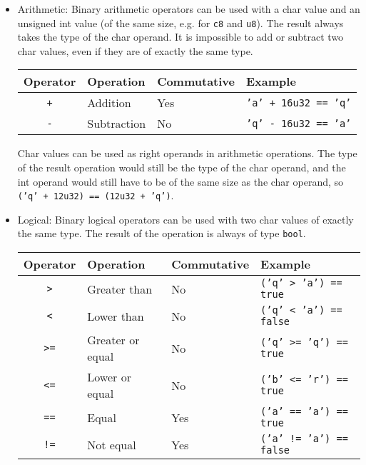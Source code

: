 \begin{itemize}
\item Arithmetic: Binary arithmetic operators can be used with a char value and
  an unsigned int value (of the same size, e.g. for \texttt{c8} and
  \texttt{u8}). The result always takes the type of the char operand. It is
  impossible to add or subtract two char values, even if they are of exactly the
  same type.

  \begin{center}
    \vspace{-5pt}\begin{adjustbox}{max width=1.0\linewidth}
      \begin{tabular}{|c|lll|}
        \hline
        Operator & Operation & Commutative & Example\\[0pt]
        \hline
        \hline
        \texttt{+} & Addition & Yes & \texttt{'a' + 16u32 == 'q'}\\[0pt]
        \texttt{-} & Subtraction & No & \texttt{'q' - 16u32 == 'a'}\\[0pt]
        \hline
      \end{tabular}
  \end{adjustbox}\end{center}


  Char values can be used as right operands in arithmetic operations. The type of
  the result operation would still be the type of the char operand, and the int
  operand would still have to be of the same size as the char operand, so
  \texttt{('q' + 12u32) == (12u32 + 'q')}.

\item Logical: Binary logical operators can be used with two char values of
  exactly the same type. The result of the operation is always of type
  \texttt{bool}.

  \begin{center}
    \vspace{-10pt}\begin{adjustbox}{max width=1.0\linewidth}
      \begin{tabular}{|c|lll|}
        \hline
        Operator & Operation & Commutative & Example\\[0pt]
        \hline
        \hline
        \texttt{>} & Greater than & No & \texttt{('q' > 'a') == true}\\[0pt]
        \texttt{<} & Lower than & No & \texttt{('q' < 'a') == false}\\[0pt]
        \texttt{>=} & Greater or equal & No & \texttt{('q' >= 'q') == true}\\[0pt]
        \texttt{<=} & Lower or equal & No & \texttt{('b' <= 'r') == true}\\[0pt]
        \texttt{==} & Equal & Yes & \texttt{('a' == 'a') == true}\\[0pt]
        \texttt{!=} & Not equal & Yes & \texttt{('a' != 'a') == false}\\[0pt]
        \hline
      \end{tabular}
  \end{adjustbox}\end{center}


\end{itemize}
